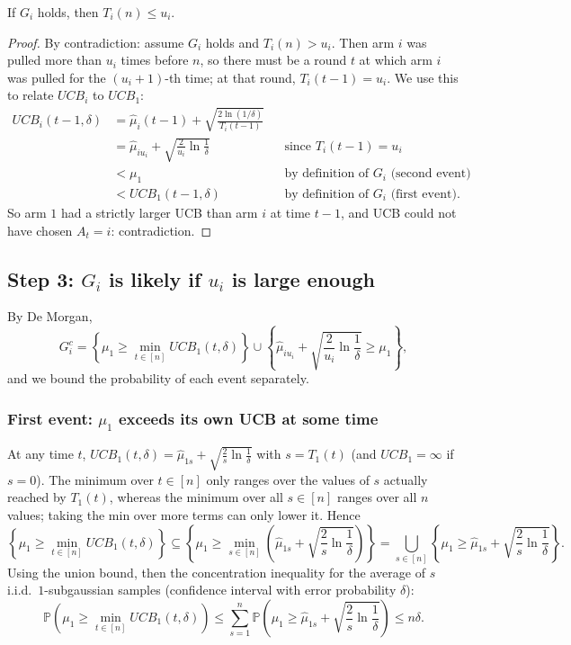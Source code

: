 \begin{lemma}
If $G_i$ holds, then $T_i(n) \leq u_i$.
\end{lemma}

\begin{proof}
By contradiction: assume $G_i$ holds and $T_i(n) > u_i$. Then arm $i$ was pulled more than $u_i$ times before $n$, so there must be a round $t$ at which arm $i$ was pulled for the $(u_i + 1)$-th time; at that round, $T_i(t-1) = u_i$. We use this to relate $UCB_i$ to $UCB_1$:
\begin{align*}
UCB_i(t-1, \delta) &= \hat{\mu}_i(t-1) + \sqrt{\frac{2\ln(1/\delta)}{T_i(t-1)}} \\
&= \hat{\mu}_{iu_i} + \sqrt{\frac{2}{u_i}\ln\frac{1}{\delta}} &&\text{since } T_i(t-1) = u_i \\
&< \mu_1 &&\text{by definition of } G_i \text{ (second event)} \\
&< UCB_1(t-1, \delta) &&\text{by definition of } G_i \text{ (first event)}.
\end{align*}
So arm $1$ had a strictly larger UCB than arm $i$ at time $t-1$, and UCB could not have chosen $A_t = i$: contradiction.
\end{proof}

\subsection{Step 3: $G_i$ is likely if $u_i$ is large enough}

By De Morgan,
\[
G_i^c = \left\{\mu_1 \geq \min_{t \in [n]} UCB_1(t, \delta)\right\} \cup \left\{\hat{\mu}_{iu_i} + \sqrt{\frac{2}{u_i}\ln\frac{1}{\delta}} \geq \mu_1\right\},
\]
and we bound the probability of each event separately.

\subsubsection*{First event: $\mu_1$ exceeds its own UCB at some time}

At any time $t$, $UCB_1(t, \delta) = \hat{\mu}_{1s} + \sqrt{\frac{2}{s}\ln\frac{1}{\delta}}$ with $s = T_1(t)$ (and $UCB_1 = \infty$ if $s = 0$). The minimum over $t \in [n]$ only ranges over the values of $s$ actually reached by $T_1(t)$, whereas the minimum over all $s \in [n]$ ranges over all $n$ values; taking the min over more terms can only lower it. Hence
\[
\left\{\mu_1 \geq \min_{t \in [n]} UCB_1(t, \delta)\right\} \subseteq \left\{\mu_1 \geq \min_{s \in [n]} \left(\hat{\mu}_{1s} + \sqrt{\frac{2}{s}\ln\frac{1}{\delta}}\right)\right\} = \bigcup_{s \in [n]} \left\{\mu_1 \geq \hat{\mu}_{1s} + \sqrt{\frac{2}{s}\ln\frac{1}{\delta}}\right\}.
\]
Using the union bound, then the concentration inequality for the average of $s$ i.i.d.\ $1$-subgaussian samples (confidence interval with error probability $\delta$):
\[
\mathbb{P}\left(\mu_1 \geq \min_{t \in [n]} UCB_1(t, \delta)\right) \leq \sum_{s=1}^n \mathbb{P}\left(\mu_1 \geq \hat{\mu}_{1s} + \sqrt{\frac{2}{s}\ln\frac{1}{\delta}}\right) \leq n\delta.
\]

